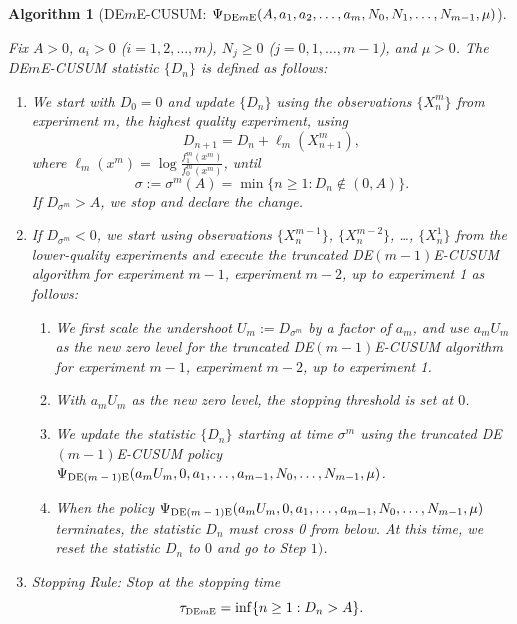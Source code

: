 \documentclass[journal, onecolumn]{IEEEtran}
\newtheorem{algorithm}{Algorithm}
\begin{document}
\begin{algorithm}[DE$m$E-CUSUM: $\Psi_{\textup{DE$m$E}} (A, a_1, a_2, \dots, a_m, N_0, N_1, \dots, N_{m - 1}, \mu)$]
\label{alg:deme-cusum}

Fix $A > 0$, $a_i > 0$ ($i = 1, 2, \dots, m$), $N_j \geq 0$ ($j = 0, 1, \dots, m - 1$), and $\mu > 0$. The \textup{DE$m$E-CUSUM} statistic $\{ D_n \}$ is defined as follows:

\begin{enumerate}
\item We start with $D_0 = 0$ and update $\{ D_n \}$ using the observations $\{ X_n^m \}$ from experiment $m$, the highest quality experiment, using
$$ D_{n + 1}  = D_n + \ell_m (X_{n + 1}^m), $$
where $\ell_m (x^m) = \log \frac{f_1^m (x^m)}{f_0^m (x^m)}$, until 
$$ \sigma := \sigma^m (A) = \min \{ n \geq 1: D_n \notin (0, A) \}. $$
If $D_{\sigma^m} > A$, we stop and declare the change.

\item If $D_{\sigma^m} < 0$, we start using observations $\{ X_n^{m - 1} \}$, $\{ X_n^{m - 2} \}$, \dots, $\{ X_n^1 \}$ from the lower-quality experiments and execute the truncated \textup{DE$(m - 1)$E-CUSUM} algorithm for experiment $m - 1$, experiment $m - 2$, up to experiment 1 as follows:

    \begin{enumerate}
    \item We first scale the undershoot $U_m:= D_{\sigma^m}$ by a factor of $a_m$, and use $a_m U_m$ as the new zero level for the truncated \textup{DE$(m - 1)$E-CUSUM} algorithm for experiment $m - 1$, experiment $m - 2$, up to experiment 1.
    
    \item With $a_m U_m$ as the new zero level, the stopping threshold is set at $0$.
    
    \item We update the statistic $\{ D_n \}$ starting at time $\sigma^m$ using the truncated \textup{DE$(m - 1)$E-CUSUM} policy \\ $\Psi_{\textup{DE$(m - 1)$E}} (a_m U_m, 0, a_1, \dots, a_{m - 1}, N_0, \dots, N_{m - 1}, \mu)$.
    
    \item When the policy $\Psi_{\textup{DE$(m - 1)$E}} (a_m U_m, 0, a_1, \dots, a_{m - 1}, N_0, \dots, N_{m - 1}, \mu)$ terminates, the statistic $D_n$ must cross 0 from below. At this time, we reset the statistic $D_n$ to $0$ and go to Step $1)$.
    \end{enumerate}

\item Stopping Rule: Stop at the stopping time
$$ \tau_{\textup{\fontsize{6 pt}{10 pt}\selectfont DE$m$E}} = \inf \{ n \geq 1: D_n > A \}. $$
\end{enumerate}    
\end{algorithm}
\end{document}
